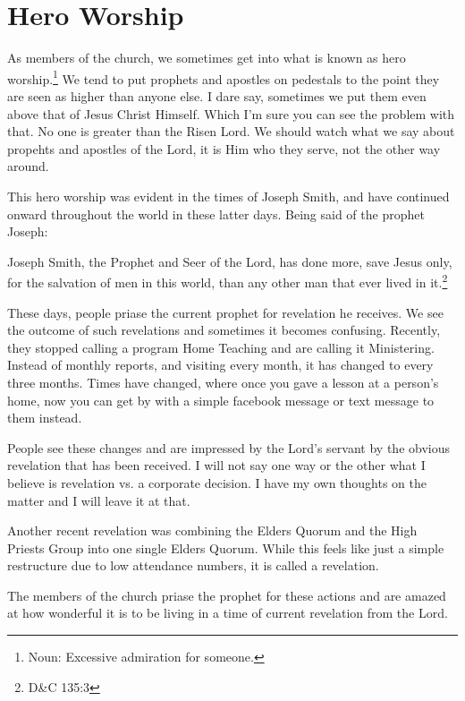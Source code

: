 \chapter{Hero Worship}

As members of the church, we sometimes get into what is known as hero
worship.\footnote{Noun: Excessive admiration for someone.} We tend to put prophets
and apostles on pedestals to the point they are seen as higher than anyone else. I
dare say, sometimes we put them even above that of Jesus Christ Himself. Which I'm
sure you can see the problem with that. No one is greater than the Risen Lord. We
should watch what we say about propehts and apostles of the Lord, it is Him who they
serve, not the other way around.

This hero worship was evident in the times of Joseph Smith, and have continued onward
throughout the world in these latter days. Being said of the prophet Joseph:

\begin{displayquote}
Joseph Smith, the Prophet and Seer of the Lord, has done more, save Jesus only, 
for the salvation of men in this world, than any other man that ever lived in
it.\footnote{D\&C 135:3}
\end{displayquote}

These days, people priase the current prophet for revelation he receives. We see the
outcome of such revelations and sometimes it becomes confusing. Recently, they
stopped calling a program Home Teaching and are calling it Ministering. Instead of
monthly reports, and visiting every month, it has changed to every three months.
Times have changed, where once you gave a lesson at a person's home, now you can get
by with a simple facebook message or text message to them instead.

People see these changes and are impressed by the Lord's servant by the obvious
revelation that has been received. I will not say one way or the other what I believe
is revelation vs. a corporate decision. I have my own thoughts on the matter and I
will leave it at that.

Another recent revelation was combining the Elders Quorum and the High Priests Group
into one single Elders Quorum. While this feels like just a simple restructure due to
low attendance numbers, it is called a revelation.

The members of the church priase the prophet for these actions and are amazed at how
wonderful it is to be living in a time of current revelation from the Lord.

